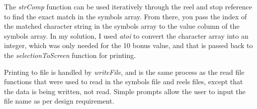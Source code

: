 \documentclass[12pt]{article}
\begin{document}
The \emph{strComp} function can be used iteratively through the reel and stop reference to find the exact match in the symbols array.  From there, you pass the index of the matched character string in the symbols array to the value column of the symbols array.  In my solution, I used \emph{atoi} to convert the character array into an integer, which was only needed for the 10 bonus value, and that is passed back to the \emph{selectionToScreen} function for printing.

Printing to file is handled by \emph{writeFile}, and is the same process as the read file functions that were used to read in the symbols file and reels files, except that the data is being written, not read.  Simple prompts allow the user to input the file name as per design requirement.  
\end{document}
